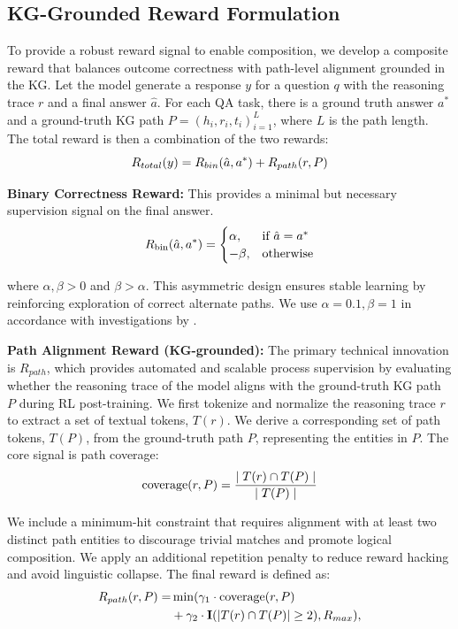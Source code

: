 \documentclass{article}
\theoremstyle{plain}
\theoremstyle{definition}
\theoremstyle{remark}
\begin{document}
\subsection{KG-Grounded Reward Formulation}
\label{Reward_func}
To provide a robust reward signal to enable composition, we develop a composite reward that balances outcome correctness with path-level alignment grounded in the KG. Let the model generate a response $y$ for a question $q$ with the reasoning trace $r$ and a final answer $\hat{a}$. For each QA task, there is a ground truth answer $a^*$ and a ground-truth KG path $P = {(h_i, r_i, t_i)}_{i=1}^L$, where $L$ is the path length. The total reward is then a combination of the two rewards:
\[
\vspace{-0.5em}
R_{total}(y) = R_{bin}(\hat{a}, a^*) + R_{path}(r,P)
\vspace{-0.5em}
\]

\textbf{Binary Correctness Reward:} This provides a minimal but necessary supervision signal on the final answer.
\[
\vspace{-0.5em}
R_{\text{bin}}(\hat{a}, a^*) =
\begin{cases}
\alpha, & \text{if } \hat{a} = a^* \\
-\beta, & \text{otherwise}
\end{cases}
\vspace{-0.5em}
\]

where $\alpha, \beta > 0$ and $\beta > \alpha$. This asymmetric design ensures stable learning by reinforcing exploration of correct alternate paths. We use $\alpha = 0.1, \beta = 1$ in accordance with investigations by \citep{Zhu2025}.

\textbf{Path Alignment Reward (KG-grounded):} The primary technical innovation is $R_{path}$, which provides automated and scalable process supervision by evaluating whether the reasoning trace of the model aligns with the ground-truth KG path $P$ during RL post-training. We first tokenize and normalize the reasoning trace $r$ to extract a set of textual tokens, $T(r)$. We derive a corresponding set of path tokens, $T(P)$, from the ground-truth path $P$, representing the entities in $P$. The core signal is path coverage: 
\[
\vspace{-0.5em}
\text{coverage}(r, P) = \frac{\mid T(r)\cap T(P)\mid}{\mid T(P)\mid}
\vspace{-0.5em}
\]

We include a minimum-hit constraint that requires alignment with at least two distinct path entities to discourage trivial matches and promote logical composition. We apply an additional repetition penalty to reduce reward hacking and avoid linguistic collapse. The final reward is defined as:
\[
\vspace{-0.5em}
\begin{split}
R_{path}(r, P) = &\min(\gamma_1\cdot \text{coverage}(r, P) \\
&+ \gamma_2\cdot \mathbf{I}(|T(r)\cap T(P)|\geq 2), R_{max}),
\end{split}
\vspace{-0.5em}
\]
\end{document}
